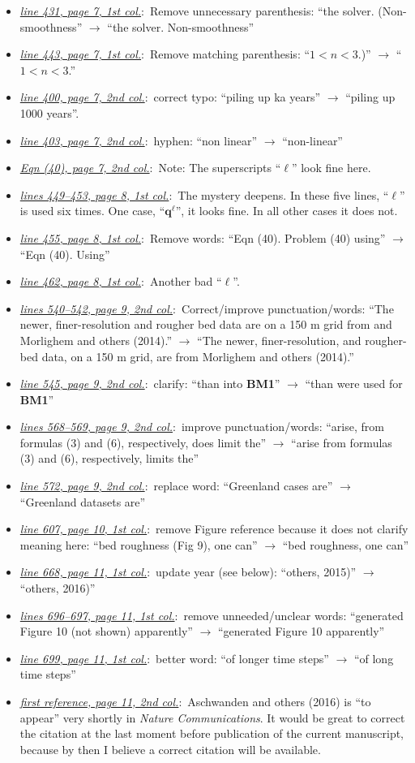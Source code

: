 \documentclass[11pt,reqno]{amsart}
\newcommand{\comm}[2]{\medskip \item[] \hspace{-0.5in}\underline{\emph{#1}}:\, #2}
\newcommand{\lnpagecol}[4]{\comm{line #1, page #2, #3 col.}{#4}}
\newcommand{\lnspagecol}[4]{\comm{lines #1, page #2, #3 col.}{#4}}
\newcommand{\eqnpagecol}[4]{\comm{Eqn #1, page #2, #3 col.}{#4}}
\begin{document}
\begin{itemize}
{\noindent Note that teletype-style font is appropriate for text that should be typed into a computer.}
\lnpagecol{431}{7}{1st}{Remove unnecessary parenthesis: ``the solver. (Non-smoothness'' $\to$ ``the solver.  Non-smoothness''}
\lnpagecol{443}{7}{1st}{Remove matching parenthesis: ``$1<n<3$.)'' $\to$ ``$1<n<3$.''}
\lnpagecol{400}{7}{2nd}{correct typo: ``piling up ka years'' $\to$ ``piling up 1000 years''.}
\lnpagecol{403}{7}{2nd}{hyphen: ``non linear'' $\to$ ``non-linear''}
\eqnpagecol{(40)}{7}{2nd}{Note: The superscripts ``$\ell$'' look fine here.}
\lnspagecol{449--453}{8}{1st}{The mystery deepens.  In these five lines, ``$\ell$'' is used six times.  One case, ``$\mathbf{q}^\ell$'', it looks fine.  In all other cases it does not.}
\lnpagecol{455}{8}{1st}{Remove words: ``Eqn (40).  Problem (40) using'' $\to$ ``Eqn (40).  Using''}
\lnpagecol{462}{8}{1st}{Another bad ``$\ell$''.}
\lnspagecol{540--542}{9}{2nd}{Correct/improve punctuation/words: ``The newer, finer-resolution and rougher bed data are on a 150 m grid from and Morlighem and others (2014).'' $\to$ ``The newer, finer-resolution, and rougher-bed data, on a 150 m grid, are from Morlighem and others (2014).''}
\lnpagecol{545}{9}{2nd}{clarify: ``than into \textbf{BM1}'' $\to$ ``than were used for \textbf{BM1}''}
\lnspagecol{568--569}{9}{2nd}{improve punctuation/words: ``arise, from formulas (3) and (6), respectively, does limit the'' $\to$ ``arise from formulas (3) and (6), respectively, limits the''}
\lnpagecol{572}{9}{2nd}{replace word: ``Greenland cases are'' $\to$ ``Greenland datasets are''}
\lnpagecol{607}{10}{1st}{remove Figure reference because it does not clarify meaning here: ``bed roughness (Fig 9), one can'' $\to$ ``bed roughness, one can''}
\lnpagecol{668}{11}{1st}{update year (see below): ``others, 2015)'' $\to$ ``others, 2016)''}
\lnspagecol{696--697}{11}{1st}{remove unneeded/unclear words: ``generated Figure 10 (not shown) apparently'' $\to$ ``generated Figure 10 apparently''}
\lnpagecol{699}{11}{1st}{better word: ``of longer time steps'' $\to$ ``of long time steps''}
\comm{first reference, page 11, 2nd col.}{Aschwanden and others (2016) is ``to appear'' very shortly in \emph{Nature Communications}.  It would be great to correct the citation at the last moment before publication of the current manuscript, because by then I believe a correct citation will be available.}
\end{itemize}
\end{document}

